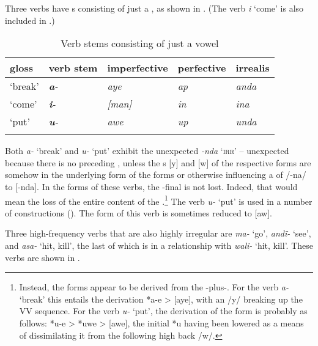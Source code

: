   Three verbs have s consisting of just a , as shown in . (The verb \textit{i} ‘come’ is also included in .)

\begin{table}
\caption{Verb stems consisting of just a vowel}
\label{tab:4.6}
\begin{tabularx}{\textwidth}{QQQQQ}
\lsptoprule
gloss & verb stem & imperfective & perfective & irrealis\\
\midrule
‘break’ & {\itshape \textbf{a}{}-} & {\itshape aye} & {\itshape ap} & {\itshape anda}\\
‘come’ & {\itshape \textbf{i}{}-} & {\itshape [man]} & {\itshape in} & {\itshape ina}\\
‘put’ & {\itshape \textbf{u}{}-} & {\itshape awe} & {\itshape up} & {\itshape unda}\\
\lspbottomrule
\end{tabularx}
\end{table}


 Both \textit{a-} ‘break’ and \textit{u-} ‘put’ exhibit the unexpected  \textit{-nda} \textsc{‘irr’} -- unexpected because there is no preceding  , unless the s [y] and [w] of the respective  forms are somehow in the underlying form of the  forms or otherwise influencing a  of /-na/ to [-nda]. In the  forms of these verbs, the -final  is not lost. Indeed, that would mean the loss of the entire  content of the .\footnote{Instead, the  forms appear to be derived from the -plus-. For the verb \textit{a-} ‘break’ this entails the derivation *a-e > [aye], with an   /y/ breaking up the VV sequence. For the verb \textit{u-} ‘put’, the derivation of the  form is probably as follows: *u-e > *uwe > [awe], the initial *u having been lowered as a means of  dissimilating it from the following high back  /w/.} The verb \textit{u-} ‘put’ is used in a number of  constructions (). The  form of this verb is sometimes reduced to [aw].

  Three high-frequency verbs that are also highly irregular are \textit{ma-} ‘go’, \textit{andï-} ‘see’, and \textit{asa-} ‘hit, kill’, the last of which is in a  relationship with \textit{wali-} ‘hit, kill’. These verbs are shown in .

